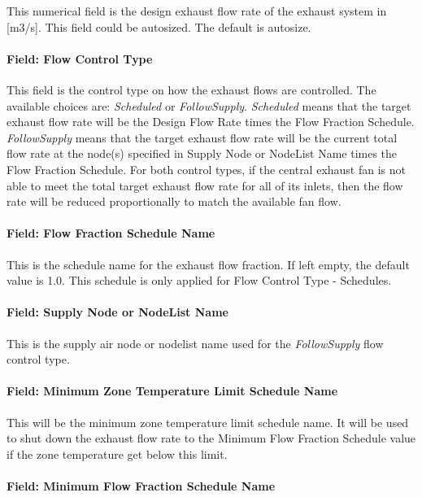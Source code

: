 This numerical field is the design exhaust flow rate of the exhaust system in [m3/s]. This field could be autosized. The default is autosize.

\paragraph{Field: Flow Control Type}

This field is the control type on how the exhaust flows are controlled. The available choices are: \emph{Scheduled} or \emph{FollowSupply}. \emph{Scheduled} means that the target exhaust flow rate will be the Design Flow Rate times the Flow Fraction Schedule. \emph{FollowSupply} means that the target exhaust flow rate will be the current total flow rate at the node(s) specified in Supply Node or NodeList Name times the Flow Fraction Schedule. For both control types, if the central exhaust fan is not able to meet the total target exhaust flow rate for all of its inlets, then the flow rate will be reduced proportionally to match the available fan flow.

\paragraph{Field: Flow Fraction Schedule Name}

This is the schedule name for the exhaust flow fraction. If left empty, the default value is 1.0. This schedule is only applied for Flow Control Type - Schedules.

\paragraph{Field: Supply Node or NodeList Name}

This is the supply air node or nodelist name used for the \emph{FollowSupply} flow control type.

\paragraph{Field: Minimum Zone Temperature Limit Schedule Name}

This will be the minimum zone temperature limit schedule name. It will be used to shut down the exhaust flow rate to the Minimum Flow Fraction Schedule value if the zone temperature get below this limit.

\paragraph{Field: Minimum Flow Fraction Schedule Name}

